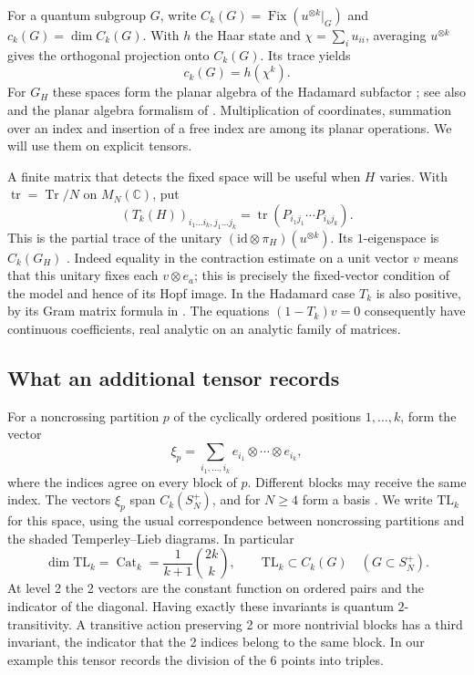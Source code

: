 \documentclass[11pt,a4paper]{amsart}
\newcommand{\Cat}{\operatorname{Cat}}
\newcommand{\Fix}{\operatorname{Fix}}
\newcommand{\Tr}{\operatorname{Tr}}
\newcommand{\tr}{\operatorname{tr}}
\newcommand{\TL}{\mathrm{TL}}
\begin{document}
For a quantum subgroup $G$, write $C_k(G)=\Fix(u^{\otimes k}|_G)$ and $c_k(G)=\dim C_k(G)$. With $h$ the Haar state and $\chi=\sum_i u_{ii}$, averaging $u^{\otimes k}$ gives the orthogonal projection onto $C_k(G)$. Its trace yields
\[
 c_k(G)=h(\chi^k).
\]
For $G_H$ these spaces form the planar algebra of the Hadamard subfactor \cite{bbs}; see also \cite[Section 2]{bo} and the planar algebra formalism of \cite{jon}. Multiplication of coordinates, summation over an index and insertion of a free index are among its planar operations. We will use them on explicit tensors.

A finite matrix that detects the fixed space will be useful when $H$ varies. With $\tr=\Tr/N$ on $M_N(\mathbb C)$, put
\[
 (T_k(H))_{i_1\ldots i_k,j_1\ldots j_k}
     =\tr(P_{i_1j_1}\cdots P_{i_kj_k}).
\]
This is the partial trace of the unitary $(\mathrm{id}\otimes\pi_H)(u^{\otimes k})$. Its $1$-eigenspace is $C_k(G_H)$ \cite[Sections 2--3]{bo}. Indeed equality in the contraction estimate on a unit vector $v$ means that this unitary fixes each $v\otimes e_a$; this is precisely the fixed-vector condition of the model and hence of its Hopf image. In the Hadamard case $T_k$ is also positive, by its Gram matrix formula in \cite{bo}. The equations $(1-T_k)v=0$ consequently have continuous coefficients, real analytic on an analytic family of matrices.

\subsection{What an additional tensor records}
For a noncrossing partition $p$ of the cyclically ordered positions $1,\ldots,k$, form the vector
\[
 \xi_p=\sum_{i_1,\ldots,i_k} e_{i_1}\otimes\cdots\otimes e_{i_k},
\]
where the indices agree on every block of $p$. Different blocks may receive the same index. The vectors $\xi_p$ span $C_k(S_N^+)$, and for $N\geq4$ form a basis \cite[Section 2]{bo}. We write $\TL_k$ for this space, using the usual correspondence between noncrossing partitions and the shaded Temperley--Lieb diagrams. In particular
\[
 \dim\TL_k=\Cat_k=\frac1{k+1}\binom{2k}{k},\qquad
 \TL_k\subset C_k(G)\quad(G\subset S_N^+).
\]
At level 2 the 2 vectors are the constant function on ordered pairs and the indicator of the diagonal. Having exactly these invariants is quantum $2$-transitivity. A transitive action preserving 2 or more nontrivial blocks has a third invariant, the indicator that the 2 indices belong to the same block. In our example this tensor records the division of the 6 points into triples.
\end{document}

